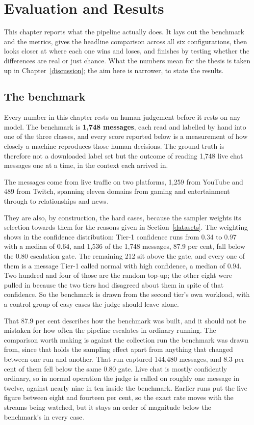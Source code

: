 \chapter{Evaluation and Results}\label{evaluation-and-results}

This chapter reports what the pipeline actually does. It lays out the benchmark and the metrics, gives the headline comparison across all six configurations, then looks closer at where each one wins and loses, and finishes by testing whether the differences are real or just chance. What the numbers mean for the thesis is taken up in Chapter~\ref{discussion}; the aim here is narrower, to state the results.

\section{The benchmark}\label{the-benchmark}

Every number in this chapter rests on human judgement before it rests on any model. The benchmark is \textbf{1,748 messages}, each read and labelled by hand into one of the three classes, and every score reported below is a measurement of how closely a machine reproduces those human decisions. The ground truth is therefore not a downloaded label set but the outcome of reading 1,748 live chat messages one at a time, in the context each arrived in.

The messages come from live traffic on two platforms, 1{,}259 from YouTube and 489 from Twitch, spanning eleven domains from gaming and entertainment through to relationships and news.

They are also, by construction, the hard cases, because the sampler weights its selection towards them for the reasons given in Section~\ref{datasets}. The weighting shows in the confidence distribution: Tier-1 confidence runs from 0.34 to 0.97 with a median of 0.64, and 1,536 of the 1,748 messages, 87.9 per cent, fall below the 0.80 escalation gate. The remaining 212 sit above the gate, and every one of them is a message Tier-1 called normal with high confidence, a median of 0.94. Two hundred and four of those are the random top-up; the other eight were pulled in because the two tiers had disagreed about them in spite of that confidence. So the benchmark is drawn from the second tier's own workload, with a control group of easy cases the judge should leave alone.

That 87.9 per cent describes how the benchmark was built, and it should not be mistaken for how often the pipeline escalates in ordinary running. The comparison worth making is against the collection run the benchmark was drawn from, since that holds the sampling effect apart from anything that changed between one run and another. That run captured 144,480 messages, and 8.3 per cent of them fell below the same 0.80 gate. Live chat is mostly confidently ordinary, so in normal operation the judge is called on roughly one message in twelve, against nearly nine in ten inside the benchmark. Earlier runs put the live figure between eight and fourteen per cent, so the exact rate moves with the streams being watched, but it stays an order of magnitude below the benchmark's in every case.


